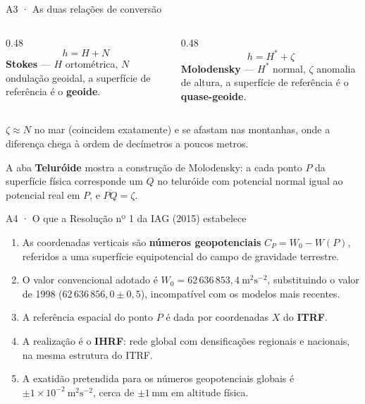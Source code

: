 \documentclass[aspectratio=169,11pt]{beamer}
\begin{document}
\begin{frame}{A3 · As duas relações de conversão}
  \small
  \begin{columns}[T]
    \begin{column}{0.48\textwidth}
      \[ h = H + N \]
      \textbf{Stokes} --- $H$ ortométrica, $N$ ondulação geoidal, a superfície de
      referência é o \textbf{geoide}.
    \end{column}
    \begin{column}{0.48\textwidth}
      \[ h = H^{*} + \zeta \]
      \textbf{Molodensky} --- $H^{*}$ normal, $\zeta$ anomalia de altura, a superfície de
      referência é o \textbf{quase-geoide}.
    \end{column}
  \end{columns}
  \medskip
  $\zeta \approx N$ no mar (coincidem exatamente) e se afastam nas montanhas, onde a
  diferença chega à ordem de decímetros a poucos metros.
  \medskip
  \begin{ideia}[title={No simulador}]
    A aba \textbf{Teluróide} mostra a construção de Molodensky: a cada ponto $P$ da
    superfície física corresponde um $Q$ no teluróide com potencial normal igual ao
    potencial real em $P$, e $\overline{PQ} = \zeta$.
  \end{ideia}
\end{frame}

\begin{frame}{A4 · O que a Resolução nº 1 da IAG (2015) estabelece}
  \small
  \begin{enumerate}
    \item As coordenadas verticais são \textbf{números geopotenciais}
          $C_P = W_0 - W(P)$, referidos a uma superfície equipotencial do campo de
          gravidade terrestre.
    \item O valor convencional adotado é
          $W_0 = 62\,636\,853{,}4\ \text{m}^2\text{s}^{-2}$, substituindo o valor de 1998
          ($62\,636\,856{,}0 \pm 0{,}5$), incompatível com os modelos mais recentes.
    \item A referência espacial do ponto $P$ é dada por coordenadas $X$ do \textbf{ITRF}.
    \item A realização é o \textbf{IHRF}: rede global com densificações regionais e
          nacionais, na mesma estrutura do ITRF.
    \item A exatidão pretendida para os números geopotenciais globais é
          $\pm 1 \times 10^{-2}\ \text{m}^2\text{s}^{-2}$, cerca de $\pm 1$\,mm em
          altitude física.
  \end{enumerate}
\end{frame}
\end{document}

